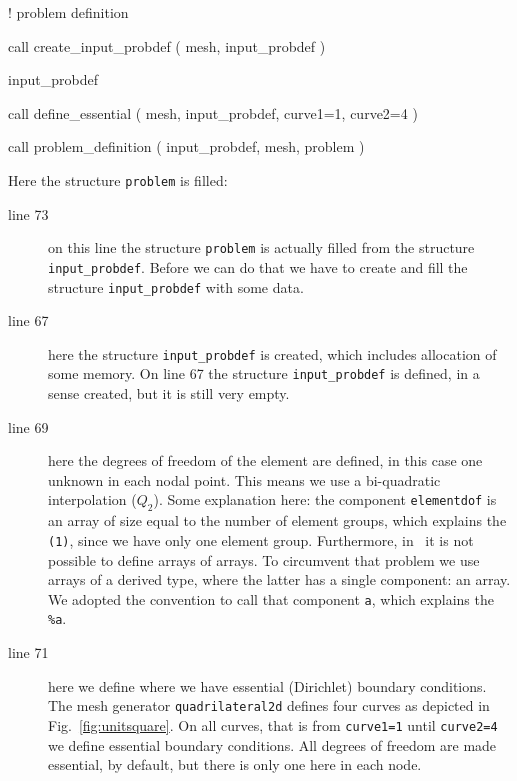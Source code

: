 \begin{listingcont}
! problem definition
                                                                                
  call create_input_probdef ( mesh, input_probdef )

  input_probdef%

  call define_essential ( mesh, input_probdef, curve1=1, curve2=4 )

  call problem_definition ( input_probdef, mesh, problem )

\end{listingcont}
Here the structure \texttt{problem} is filled:
\begin{description}
   \item[line 73] on this line the structure \texttt{problem} is actually
filled from the structure \texttt{input\_probdef}. Before we can do that we have
to create and fill the structure \texttt{input\_probdef} with some data.
   \item[line 67] here the structure \texttt{input\_probdef} is created,
      which includes allocation of some memory. On line 67 the structure
     \texttt{input\_probdef} is defined, in a sense created, but it is still
     very empty.
   \item[line 69] here the degrees of freedom of the element are defined, in
     this case one unknown in each nodal point. This means we use a bi-quadratic
     interpolation ($Q_2$). Some explanation here: the
component \texttt{elementdof} is an array of size equal to the number of
element groups, which explains the \texttt{(1)}, since we have only one element
group. Furthermore, in \ftn\ it is not possible to define arrays of arrays. To
circumvent that problem we use arrays of a derived type, where the latter has a
single component: an array. We adopted the convention to call that component
\texttt{a}, which explains the \texttt{\%a}.
   \item[line 71] here we define where we have essential (Dirichlet)
boundary conditions. The mesh generator \texttt{quadrilateral2d} defines four
curves as depicted in Fig.~\ref{fig:unitsquare}. On all curves, that is from
\texttt{curve1=1} until \texttt{curve2=4} we define essential boundary
conditions. All degrees of freedom are made essential, by default, but there is
only one here in each node.
\end{description}

